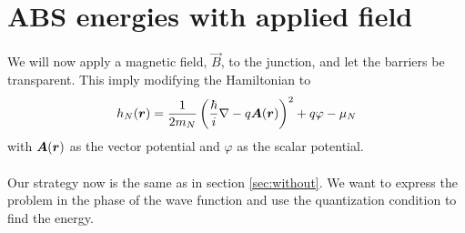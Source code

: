 \section{ABS energies with applied field}
We will now apply a magnetic field, $\vec{B}$, to the junction, and let the barriers be transparent. This imply modifying the Hamiltonian to 
\begin{equation}
    h_N(\boldsymbol{r}) = \frac{1}{2m_N}\left(\frac{\hbar}{i}\nabla-q\boldsymbol{A}(\boldsymbol{r})\right)^2+q\varphi-\mu_N    
\end{equation}
with $\boldsymbol{A}(\boldsymbol{r})$ as the vector potential and $\varphi$ as the scalar potential. 
\\
\\
Our strategy now is the same as in section \ref{sec:without}. We want to express the problem in the phase of the wave function and use the quantization condition to find the energy.

